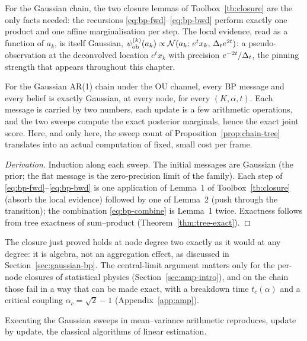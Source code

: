 For the Gaussian chain, the two closure lemmas of
Toolbox~\ref{tb:closure} are the only facts needed: the recursions
\eqref{eq:bp-fwd}--\eqref{eq:bp-bwd} perform exactly one product and one
affine marginalisation per step. The local evidence, read as a function
of $a_k$, is itself Gaussian,
$\psi^{(k)}_{\mathrm{ob}}(a_k) \propto
\mathcal{N}(a_k;\, e^{t} x_k,\, \Delta_t e^{2t})$: a pseudo-observation at the
deconvolved location $e^t x_k$ with precision $e^{-2t}/\Delta_t$, the
pinning strength that appears throughout this chapter.

\begin{theorem}\label{thm:bp-closure}
For the Gaussian AR(1) chain under the OU channel, every BP message and
every belief is exactly Gaussian, at every node, for every
$(K, \alpha, t)$. Each message is carried by two numbers, each update
is a few arithmetic operations, and the two sweeps compute the exact
posterior marginals, hence the exact joint score. Here, and only here,
the sweep count of Proposition~\ref{prop:chain-tree} translates into an
actual computation of fixed, small cost per frame.
\end{theorem}

\begin{proof}[Derivation]
Induction along each sweep. The initial messages are Gaussian (the
prior; the flat message is the zero-precision limit of the family). Each
step of \eqref{eq:bp-fwd}--\eqref{eq:bp-bwd} is one application of
Lemma~1 of Toolbox~\ref{tb:closure} (absorb the local evidence) followed
by one of Lemma~2 (push through the transition); the combination
\eqref{eq:bp-combine} is Lemma~1 twice. Exactness follows from tree
exactness of sum--product (Theorem~\ref{thm:tree-exact}).
\end{proof}

\begin{remark}
\label{rmk:bp-no-clt}
The closure just proved holds at node degree two exactly as it would at
any degree: it is algebra, not an aggregation effect, as discussed in
Section~\ref{sec:gaussian-bp}. The central-limit argument matters only
for the per-node closures of statistical physics
(Section~\ref{sec:amp-intro}), and on the chain those fail in a way that
can be made exact, with a breakdown time $t_c(\alpha)$ and a critical
coupling $\alpha_c = \sqrt{2} - 1$ (Appendix~\ref{app:amp}).
\end{remark}

Executing the Gaussian sweeps in mean--variance arithmetic reproduces,
update by update, the classical algorithms of linear estimation.

